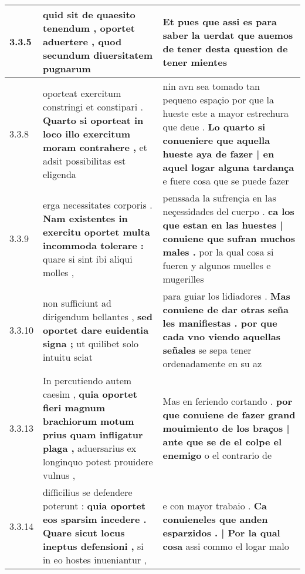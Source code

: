 \begin{tabular}{|p{1cm}|p{6.5cm}|p{6.5cm}|}
3.3.5 & quid sit de quaesito tenendum , \textbf{ oportet aduertere , } quod secundum diuersitatem pugnarum & Et pues que assi es para saber la uerdat \textbf{ que auemos de tener } desta question de tener mientes \\\hline
3.3.8 & oporteat exercitum constringi et constipari . \textbf{ Quarto si oporteat in loco illo exercitum moram contrahere , } et adsit possibilitas est eligenda & nin avn sea tomado tan pequeno espaçio por que la hueste este a mayor estrechura que deue . \textbf{ Lo quarto si conueniere que aquella hueste aya de fazer | en aquel logar alguna tardança } e fuere cosa que se puede fazer \\\hline
3.3.9 & erga necessitates corporis . \textbf{ Nam existentes in exercitu oportet multa incommoda tolerare : } quare si sint ibi aliqui molles , & penssada la sufrençia en las neçessidades del cuerpo . \textbf{ ca los que estan en las huestes | conuiene que sufran muchos males . } por la qual cosa si fueren y algunos muelles e mugerilles \\\hline
3.3.10 & non sufficiunt ad dirigendum bellantes , \textbf{ sed oportet dare euidentia signa ; } ut quilibet solo intuitu sciat & para guiar los lidiadores . \textbf{ Mas conuiene de dar otras seña les manifiestas . por que cada vno viendo aquellas señales } se sepa tener ordenadamente en su az \\\hline
3.3.13 & In percutiendo autem caesim , \textbf{ quia oportet fieri magnum brachiorum motum prius quam infligatur plaga , } aduersarius ex longinquo potest prouidere vulnus , & Mas en feriendo cortando . \textbf{ por que conuiene de fazer grand mouimiento de los braços | ante que se de el colpe el enemigo } o el contrario de \\\hline
3.3.14 & difficilius se defendere poterunt : \textbf{ quia oportet eos sparsim incedere . Quare sicut locus ineptus defensioni , } si in eo hostes inueniantur , & e con mayor trabaio . \textbf{ Ca conuieneles que anden esparzidos . | Por la qual cosa } assi commo el logar malo \\\hline

\end{tabular}
